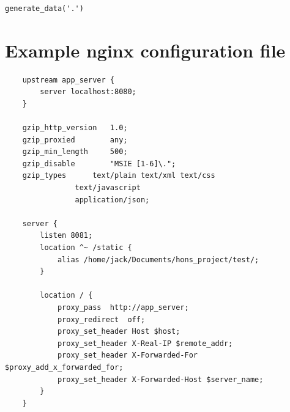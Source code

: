 \documentclass[12pt]{article}
\begin{document}
\begin{appendices}
\begin{lstlisting}
generate_data('.')
\end{lstlisting}


\section{Example nginx configuration file}
\begin{lstlisting}
	upstream app_server {
		server localhost:8080;
	}

	gzip_http_version	1.0;
	gzip_proxied		any;
	gzip_min_length		500;
	gzip_disable		"MSIE [1-6]\.";
	gzip_types		text/plain text/xml text/css
				text/javascript
				application/json;

	server {
		listen 8081;
		location ^~ /static {
			alias /home/jack/Documents/hons_project/test/;
		}

		location / {
			proxy_pass	http://app_server;
			proxy_redirect	off;
			proxy_set_header Host $host;
			proxy_set_header X-Real-IP $remote_addr;
			proxy_set_header X-Forwarded-For $proxy_add_x_forwarded_for;
			proxy_set_header X-Forwarded-Host $server_name;
		}
	}
\end{lstlisting}
\end{appendices}
\end{document}
